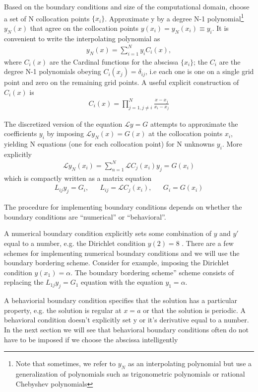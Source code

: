 \documentclass[aps,prd,amsmath,showpacs,amssymb,superscriptaddress,nofootinbib,longbibliography,eqsecnum,preprintnumbers]{revtex4-1}
\begin{document}
Based on the boundary conditions and size of the computational domain, choose a set of N collocation points $\{x_i\}$. 
Approximate y by a degree N-1 polynomial\footnote{Note that sometimes, we refer to $y_N$ as an interpolating polynomial but use a generalization of polynomials such as trigonometric polynomials or rational Chebyshev polynomials} $y_N(x)$ that agree on the collocation points $y(x_i)=y_N(x_i)\equiv y_i$. It is convenient to write the interpolating polynomial as
\begin{align}
y_N(x)=\sum_{i=1}^N y_i C_i(x),
\end{align}
where $C_i(x)$ are the Cardinal functions for the abscissa $\{x_i\}$; the ${C_i}$ are the degree N-1 polynomials obeying $C_i(x_j)=\delta_{ij}$, i.e each one is one on a single grid point and zero on the remaining grid points. A useful explicit construction of $C_i(x)$ is 
\begin{align}
C_i(x)=\prod_{j=1, j\neq i}^N\frac{x-x_j}{x_i-x_j}
\end{align}


The discretized version of the equation $\mathcal{L} y =G$ attempts to approximate the coefficients $y_i$ by imposing $\mathcal{L} y_N(x) =G(x)$ at the collocation points $x_i$, yielding N equations (one for each collocation point) for N unknowns $y_i$. More explicitly
\begin{align}
\mathcal{L} y_N(x_i) =\sum_{n=1}^N \mathcal{L}C_j(x_i)y_j =G(x_i)
\end{align}
which is compactly written as a matrix equation
\begin{align}
&L_{ij}y_j=G_i,& &L_{ij}=\mathcal{L}C_j(x_i),&
&G_i=G(x_i)&
\end{align}

The procedure for implementing boundary conditions depends on whether the boundary conditions are ``numerical'' or ``behavioral''\cite{Boyd99chebyshevand}. 

A numerical boundary condition explicitly sets some combination of $y$ and $y'$ equal to a number, e.g. the Dirichlet condition $y(2)=8$ . There are a few schemes for implementing numerical boundary conditions and we will use the boundary bordering scheme. Consider for example, imposing the Dirichlet condition $y(x_1) =\alpha$. The boundary bordering scheme''  scheme consists of replacing the $L_{1j}y_j=G_1$ equation with the equation $y_1=\alpha$. 

A behaviorial boundary condition specifies that the solution has a particular property, e.g. the solution is regular at $x=a$ or that the solution is periodic. A behavioral condition  doesn't explicitly set y or it's derivative equal to a number. In the next section we will see that behavioral boundary conditions often do not have to be imposed if we choose the abscissa intelligently
\end{document}
